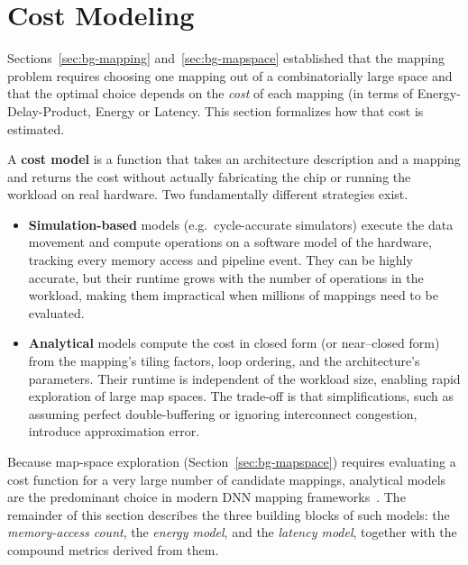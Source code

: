 \section{Cost Modeling}
\label{sec:bg-cost-model}

Sections~\ref{sec:bg-mapping} and~\ref{sec:bg-mapspace} established that the
mapping problem requires choosing one mapping out of a combinatorially large
space and that the optimal choice depends on the \emph{cost} of each mapping (in terms of Energy-Delay-Product, Energy or Latency.
This section formalizes how that cost is estimated.

A \textbf{cost model} is a function that takes an architecture description and
a mapping and returns the cost without actually fabricating the chip or
running the workload on real hardware.
Two fundamentally different strategies exist.

\begin{itemize}
  \item \textbf{Simulation-based} models (e.g.\ cycle-accurate simulators)
        execute the data movement and compute operations on a software model of
        the hardware, tracking every memory access and pipeline event.
        They can be highly accurate, but their runtime grows with the number
        of operations in the workload, making them impractical when millions
        of mappings need to be evaluated.
  \item \textbf{Analytical} models compute the cost in closed form (or
        near--closed form) from the mapping's tiling factors, loop ordering,
        and the architecture's parameters.
        Their runtime is independent of the workload size, enabling rapid
        exploration of large map spaces.
        The trade-off is that simplifications, such as assuming perfect
        double-buffering or ignoring interconnect congestion, introduce
        approximation error.
\end{itemize}

Because map-space exploration (Section~\ref{sec:bg-mapspace}) requires
evaluating a cost function for a very large number of candidate mappings,
analytical models are the predominant choice in modern DNN mapping
frameworks~\cite{parashar2019timeloop, wu2019accelergy, kwon2019MAESTRO}.
The remainder of this section describes the three building blocks of such
models: the \emph{memory-access count}, the \emph{energy model}, and the
\emph{latency model}, together with the compound metrics derived from them.

